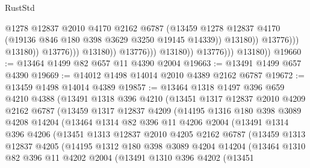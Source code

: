 \begin{lexlean}{RustStd}
\begin{coremodule}
{\begin{coremodule}
{{{{{{{{{{{{{{{{{{{{{{{{{{{{{{{                                                @1278
                                                @12837
                                                @2010
                                                @4170
                                                @2162
                                                @6787
                                                (@13459
                                                  @1278
                                                  @12837
                                                  @4170
                                                  (@19136 @846 @180 @398 @3629 @3250 @19145 @14339))
                                                @13180))
                                            @13776)))
                                      @13180))
                                  @13776)))
                            @13180))
                        @13776)))
                  @13180))
              @13776)))
        @13180))
@19660 := @13464 @1499 @82 @657 @11 @4390 @2004
@19663 := @13491 @1499 @657 @4390
@19669 := @14012 @1498 @14014 @2010 @4389 @2162 @6787
@19672 := @13459 @1498 @14014 @4389
@19857 := @13464
    @1318
    @1497
    @396
    @659
    @4210
    @4388
    (@13491
      @1318
      @396
      @4210
      (@13451
        @1317
        @12837
        @2010
        @4209
        @2162
        @6787
        (@13459
          @1317
          @12837
          @4209
          (@14195
            @1316
            @180
            @398
            @3089
            @4208
            @14204
            (@13464
              @1314
              @82
              @396
              @11
              @4206
              @2004
              (@13491
                @1314
                @396
                @4206
                (@13451
                  @1313
                  @12837
                  @2010
                  @4205
                  @2162
                  @6787
                  (@13459
                    @1313
                    @12837
                    @4205
                    (@14195
                      @1312
                      @180
                      @398
                      @3089
                      @4204
                      @14204
                      (@13464
                        @1310
                        @82
                        @396
                        @11
                        @4202
                        @2004
                        (@13491
                          @1310
                          @396
                          @4202
                          (@13451
}}}}}}}}}}}}}}}}}}}}}}}}}}}}}}}
\end{coremodule}}
\end{coremodule}
\end{lexlean}
